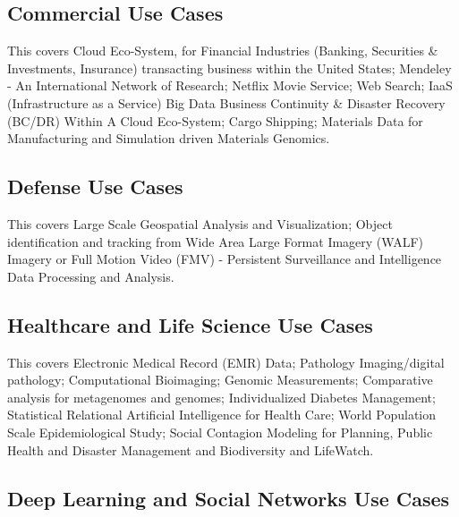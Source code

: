 

\subsection{Commercial Use Cases}

This covers Cloud Eco-System, for Financial Industries (Banking,
Securities \& Investments, Insurance) transacting business within the
United States; Mendeley - An International Network of Research; Netflix
Movie Service; Web Search; IaaS (Infrastructure as a Service) Big Data
Business Continuity \& Disaster Recovery (BC/DR) Within A Cloud
Eco-System; Cargo Shipping; Materials Data for Manufacturing and
Simulation driven Materials Genomics.




\subsection{Defense Use Cases}

This covers Large Scale Geospatial Analysis and Visualization; Object
identification and tracking from Wide Area Large Format Imagery (WALF)
Imagery or Full Motion Video (FMV) - Persistent Surveillance and
Intelligence Data Processing and Analysis.




\subsection{Healthcare and Life Science Use Cases}

This covers Electronic Medical Record (EMR) Data; Pathology
Imaging/digital pathology; Computational Bioimaging; Genomic
Measurements; Comparative analysis for metagenomes and genomes;
Individualized Diabetes Management; Statistical Relational Artificial
Intelligence for Health Care; World Population Scale Epidemiological
Study; Social Contagion Modeling for Planning, Public Health and
Disaster Management and Biodiversity and LifeWatch.




\subsection{Deep Learning and Social Networks Use Cases}

